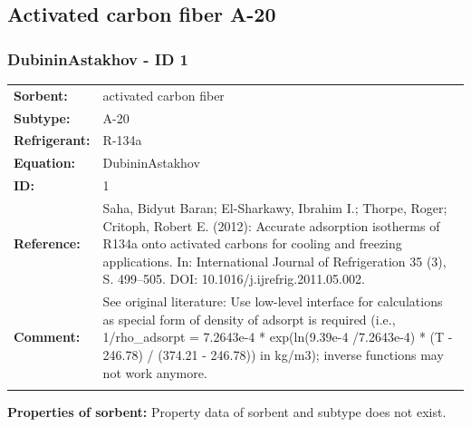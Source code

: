 \subsection{Activated carbon fiber A-20}
%
\subsubsection{DubininAstakhov - ID 1}
%
\begin{tabular}[l]{|lp{11.5cm}|}
\hline
\addlinespace

\textbf{Sorbent:} & activated carbon fiber \\
\textbf{Subtype:} & A-20 \\
\textbf{Refrigerant:} & R-134a \\
\textbf{Equation:} & DubininAstakhov \\
\textbf{ID:} & 1 \\
\textbf{Reference:} & Saha, Bidyut Baran; El-Sharkawy, Ibrahim I.; Thorpe, Roger; Critoph, Robert E. (2012): Accurate adsorption isotherms of R134a onto activated carbons for cooling and freezing applications. In: International Journal of Refrigeration 35 (3), S. 499–505. DOI: 10.1016/j.ijrefrig.2011.05.002. \\
\textbf{Comment:} & See original literature: Use low-level interface for calculations as special form of density of adsorpt is required (i.e., 1/rho\_adsorpt = 7.2643e-4 * exp(ln(9.39e-4 /7.2643e-4) * (T - 246.78) / (374.21 - 246.78)) in kg/m3); inverse functions may not work anymore. \\

\addlinespace
\hline
\end{tabular}
\newline

\textbf{Properties of sorbent:}
\newline
%
Property data of sorbent and subtype does not exist.

